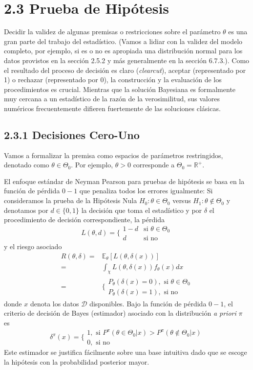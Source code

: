 \documentclass[12pt,]{article}
\begin{document}
\section{2.3 Prueba de Hipótesis}\label{prueba-de-hipotesis}

Decidir la validez de algunas premisas o restricciones sobre el
parámetro \(\theta\) es una gran parte del trabajo del estadístico.
(Vamos a lidiar con la validez del modelo completo, por ejemplo, si es o
no es apropiada una distribución normal para los datos provistos en la
sección 2.5.2 y más generalmente en la sección 6.7.3.). Como el
resultado del proceso de decisión es claro (\emph{clearcut}), aceptar
(representado por 1) o rechazar (representado por 0), la construcción y
la evaluación de los procedimientos es crucial. Mientras que la solución
Bayesiana es formalmente muy cercana a un estadístico de la razón de la
verosimilitud, sus valores numéricos frecuentemente difieren fuertemente
de las soluciones clásicas.

\subsection{2.3.1 Decisiones Cero-Uno}\label{decisiones-cero-uno}

Vamos a formalizar la premisa como espacios de parámetros restringidos,
denotado como \(\theta\in\Theta_0\). Por ejemplo, \(\theta>0\)
corresponde a \(\Theta_0=\mathbb{R}^+\).

El enfoque estándar de Neyman Pearson para pruebas de hipótesis se basa
en la función de pérdida \(0-1\) que penaliza todos los errores
igualmente: Si consideramos la prueba de la Hipótesis Nula
\(H_0: \theta\in\Theta_0\) versus \(H_1: \theta\notin\Theta_0\) y
denotamos por \(d\in\{0,1\}\) la decisión que toma el estadístico y por
\(\delta\) el procedimiento de decisión correspondiente, la pérdida \[
L(\theta,d)=\Bigg\{
\begin{array}{ll}
1-d &\text{si } \theta\in\Theta_0\\
d &\text{si no}
\end{array}
\] y el riesgo asociado \[
\begin{array}{rl}
R(\theta,\delta) = & \mathbb{E}_\theta[L(\theta,\delta(x))]\\
= & \displaystyle\int_\chi L(\theta,\delta(x))f_\theta(x)dx\\
= & \bigg\{
\displaystyle\begin{array}{lr}
P_\theta(\delta(x)=0), \text{ si }\theta\in\Theta_0\\
P_\theta(\delta(x)=1), \text{ si no}
\end{array}
\end{array}
\] donde \(x\) denota los datos \(\mathcal{D}\) disponibles. Bajo la
función de pérdida \(0-1\), el criterio de decisión de Bayes (estimador)
asociado con la distribución \emph{a priori} \(\pi\) es \[
\delta^\pi(x)=\Bigg\{
\begin{array}{lr}
1, \text{ si }P^\pi(\theta\in\Theta_0|x)>P^\pi(\theta\notin\Theta_0|x)\\
0, \text{ si no}
\end{array}
\] Este estimador se justifica fácilmente sobre una base intuitiva dado
que se escoge la hipótesis con la probabilidad posterior mayor.
\end{document}
